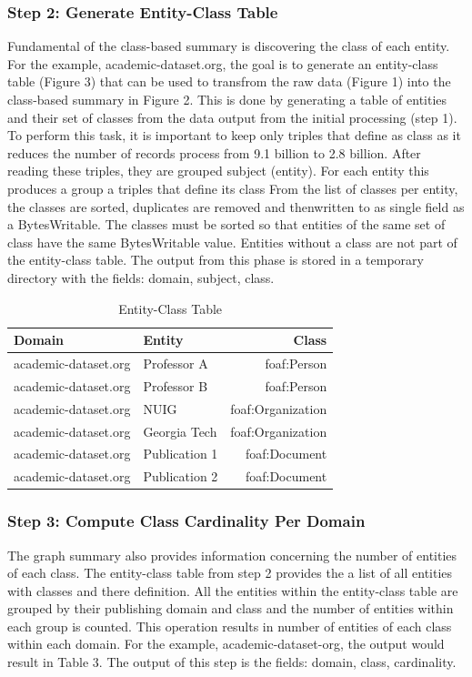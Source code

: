 \documentclass[11pt,onecolumn]{article}
\begin{document}
\subsubsection{Step 2: Generate Entity-Class Table}
Fundamental of the class-based summary is discovering the class of each entity. For the example, academic-dataset.org, the goal is to generate an entity-class table (Figure 3) that can be used to transfrom the raw data (Figure 1) into the class-based summary in Figure 2.  This is done by generating a table of entities and their set of classes from the data output from the initial processing (step 1).  To perform this task, it is important to keep only triples that define as class as it reduces the number of records process from 9.1 billion to 2.8 billion. After reading these triples, they are grouped subject (entity).  For each entity this produces a group a triples that define its class  From the list of classes per entity, the classes are sorted, duplicates are removed and thenwritten to as single field as a BytesWritable.  The classes must be sorted so that entities of the same set of class have the same BytesWritable value.  Entities without a class are not part of the entity-class table.  The output from this phase is stored in a temporary directory with the fields: domain, subject, class.

\begin{table}[h!]
\begin{center}
  \begin{tabular}{| l | l | r | }
    \hline
    {\bf Domain} & {\bf Entity} & {\bf Class} \\ \hline    
    academic-dataset.org & Professor A & foaf:Person \\ \hline
    academic-dataset.org & Professor B & foaf:Person \\ \hline
    academic-dataset.org & NUIG & foaf:Organization \\ \hline
    academic-dataset.org & Georgia Tech & foaf:Organization \\ \hline
    academic-dataset.org & Publication 1 & foaf:Document \\ \hline
    academic-dataset.org & Publication 2 & foaf:Document\\ \hline
  \end{tabular}
\end{center}
\caption{Entity-Class Table}
\end{table}


\subsubsection{Step 3: Compute Class Cardinality Per Domain}
The graph summary also provides information concerning the number of entities of each class.  The entity-class table from step 2 provides the a list of all entities with classes and there definition.  All the entities within the entity-class table are grouped by their publishing domain and class and the number of entities within each group is counted. This operation results in number of entities of each class within each domain.  For the example, academic-dataset-org, the output would result in Table 3. The output of this step is the fields: domain, class, cardinality.
\end{document}
